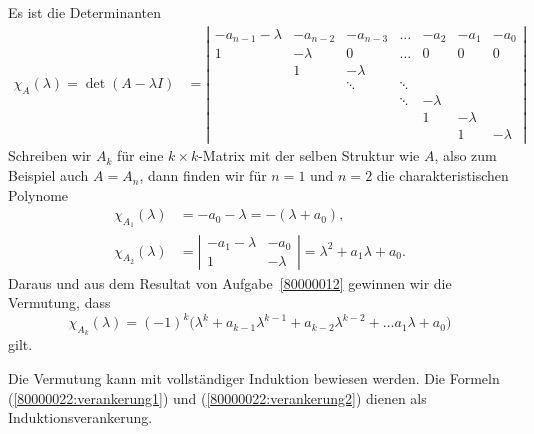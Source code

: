 \begin{loesung}
Es ist die Determinanten
\begin{align*}
\chi_A(\lambda)
=
\det(A-\lambda I)
&=
\left|\begin{matrix}
-a_{n-1}-\lambda&-a_{n-2}&-a_{n-3}&\dots & -a_2   & -a_1   & -a_0  \\
   1            &-\lambda&   0    &\dots &   0    &   0    &   0   \\
                &   1    &-\lambda&      &        &        &       \\
                &        &\ddots  &\ddots&        &        &       \\
                &        &        &\ddots&-\lambda&        &       \\
                &        &        &      &   1    &-\lambda&       \\
                &        &        &      &        &   1    &-\lambda
\end{matrix}\right|
\end{align*}
Schreiben wir $A_k$ für eine $k\times k$-Matrix mit der selben
Struktur wie $A$, also zum Beispiel auch $A=A_n$, dann finden wir
für $n=1$ und $n=2$ die charakteristischen Polynome
\begin{align}
\chi_{A_1}(\lambda)
&=
-a_0-\lambda = -(\lambda+a_0),
\label{80000022:verankerung1}
\\
\chi_{A_2}(\lambda)
&=
\left|\begin{matrix}
-a_1-\lambda&  -a_0  \\
1           &-\lambda
\end{matrix}\right|
=\lambda^2+a_1\lambda+a_0.
\label{80000022:verankerung2}
\end{align}
Daraus und aus dem Resultat von Aufgabe~\ref{80000012} gewinnen wir
die Vermutung, dass 
\[
\chi_{A_k}(\lambda)
=
(-1)^k\bigl(
\lambda^k+a_{k-1}\lambda^{k-1}+a_{k-2}\lambda^{k-2}+\dots a_1\lambda+a_0
\bigr)
\]
gilt.

Die Vermutung kann mit vollständiger Induktion bewiesen werden.
Die Formeln (\ref{80000022:verankerung1}) und (\ref{80000022:verankerung2})
dienen als Induktionsverankerung.


\end{loesung}
